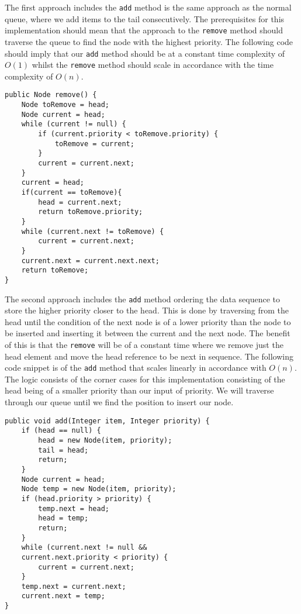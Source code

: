 \documentclass[a4paper,11pt]{article}
\begin{document}
        The first approach includes the \texttt{add} method is the same approach as the normal queue, where we add items to the tail consecutively. The prerequisites for this implementation should mean that the approach to the \texttt{remove} method should traverse the queue to find the node with the highest priority. The following code should imply that our \texttt{add} method should be at a constant time complexity of $O(1)$ whilst the \texttt{remove} method should scale in accordance with the time complexity of $O(n)$. 
        \begin{verbatim}
public Node remove() {
    Node toRemove = head;
    Node current = head;
    while (current != null) {
        if (current.priority < toRemove.priority) {
            toRemove = current;
        }
        current = current.next;
    }
    current = head;
    if(current == toRemove){
        head = current.next;
        return toRemove.priority;
    }
    while (current.next != toRemove) {
        current = current.next;
    }
    current.next = current.next.next;
    return toRemove;
}
        \end{verbatim}

        The second approach includes the \texttt{add} method ordering the data sequence to store the higher priority closer to the head. This is done by traversing from the head until the condition of the next node is of a lower priority than the node to be inserted and inserting it between the current and the next node. The benefit of this is that the \texttt{remove} will be of a constant time where we remove just the head element and move the head reference to be next in sequence. The following code snippet is of the \texttt{add} method that scales linearly in accordance with $O(n)$. The logic consists of the corner cases for this implementation consisting of the head being of a smaller priority than our input of priority. We will traverse through our queue until we find the position to insert our node. 

        \begin{verbatim}
public void add(Integer item, Integer priority) {
    if (head == null) {
        head = new Node(item, priority);
        tail = head;
        return;
    }
    Node current = head;
    Node temp = new Node(item, priority);
    if (head.priority > priority) {
        temp.next = head;
        head = temp;
        return;
    }
    while (current.next != null && 
    current.next.priority < priority) {
        current = current.next;
    }
    temp.next = current.next;
    current.next = temp;
}
        \end{verbatim}        
        
\end{document}
